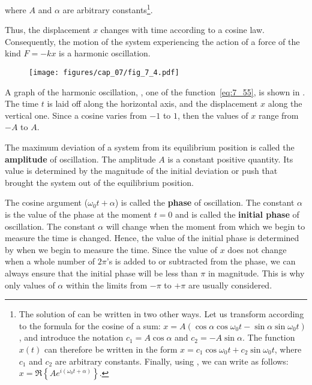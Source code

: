 \noindent
where $A$ and $\alpha$ are arbitrary constants\footnote{The solution of  can be written in two other ways. Let us transform  according to the formula for the cosine of a sum: $x = A(\cos\alpha\cos\omega_0 t - \sin\alpha\sin\omega_0 t)$, and introduce the notation $c_1=A\cos\alpha$ and $c_2=-A\sin\alpha$. The function $x(t)$ can therefore be written in the form $x=c_1\cos\omega_0 t+c_2\sin\omega_0 t$, where $c_1$ and $c_2$ are arbitrary constants. Finally, using , we can write  as follows: $x=\Re\left\{Ae^{i(\omega_0 t+\alpha)}\right\}$.}.

Thus, the displacement $x$ changes with time according to a cosine law. Consequently, the motion of the system experiencing the action of a force of the kind $F=-kx$ is a harmonic oscillation.

\begin{figure}[t]
	\begin{center}
		\texttt{[image: figures/cap\_07/fig\_7\_4.pdf]}
		\caption[]{}
		\label{fig:7_4}
	\end{center}
	\vspace{-0.7cm}
\end{figure}

A graph of the harmonic oscillation, \ie, one of the function~\eqref{eq:7_55}, is shown in . The time $t$ is laid off along the horizontal axis, and the displacement $x$ along the vertical one. Since a cosine varies from $-1$ to $1$, then the values of $x$ range from $-A$ to $A$.

The maximum deviation of a system from its equilibrium position is called the \textbf{amplitude} of oscillation. The amplitude $A$ is a constant positive quantity. Its value is determined by the magnitude of the initial deviation or push that brought the system out of the equilibrium position.

The cosine argument ($\omega_0 t+\alpha$) is called the \textbf{phase} of oscillation. The constant $\alpha$ is the value of the phase at the moment $t=0$ and is called the \textbf{initial phase} of oscillation. The constant $\alpha$ will change when the moment from which we begin to measure the time is changed. Hence, the value of the initial phase is determined by when we begin to measure the time. Since the value of $x$ does not change when a whole number of $2\pi$'s is added to or subtracted from the phase, we can always ensure that the initial phase will be less than $\pi$ in magnitude. This is why only values of $\alpha$ within the limits from $-\pi$ to $+\pi$ are usually considered.

